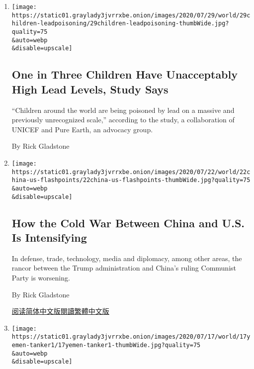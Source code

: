 \begin{enumerate}
\def\labelenumi{\arabic{enumi}.}
\item
  \href{/2020/07/29/world/americas/lead-poisoning-children.html}{}

  \texttt{[image: https://static01.graylady3jvrrxbe.onion/images/2020/07/29/world/29children-leadpoisoning/29children-leadpoisoning-thumbWide.jpg?quality=75\\\&auto=webp\\\&disable=upscale]}

  \hypertarget{one-in-three-children-have-unacceptably-high-lead-levels-study-says}{%
  \subsection{One in Three Children Have Unacceptably High Lead Levels,
  Study
  Says}\label{one-in-three-children-have-unacceptably-high-lead-levels-study-says}}

  ``Children around the world are being poisoned by lead on a massive
  and previously unrecognized scale,'' according to the study, a
  collaboration of UNICEF and Pure Earth, an advocacy group.

  By Rick Gladstone
\item
  \href{/2020/07/22/world/asia/us-china-cold-war.html}{}

  \texttt{[image: https://static01.graylady3jvrrxbe.onion/images/2020/07/22/world/22china-us-flashpoints/22china-us-flashpoints-thumbWide.jpg?quality=75\\\&auto=webp\\\&disable=upscale]}

  \hypertarget{how-the-cold-war-between-china-and-us-is-intensifying}{%
  \subsection{How the Cold War Between China and U.S. Is
  Intensifying}\label{how-the-cold-war-between-china-and-us-is-intensifying}}

  In defense, trade, technology, media and diplomacy, among other areas,
  the rancor between the Trump administration and China's ruling
  Communist Party is worsening.

  By Rick Gladstone

  \href{https://cn.nytimes3xbfgragh.onion/usa/20200723/us-china-cold-war/}{阅读简体中文版}\href{https://cn.nytimes3xbfgragh.onion/usa/20200723/us-china-cold-war/zh-hant/}{閱讀繁體中文版}
\item
  \href{/2020/07/17/world/middleeast/yemen-oil-tanker-pollution.html}{}

  \texttt{[image: https://static01.graylady3jvrrxbe.onion/images/2020/07/17/world/17yemen-tanker1/17yemen-tanker1-thumbWide.jpg?quality=75\\\&auto=webp\\\&disable=upscale]}


\end{enumerate}
